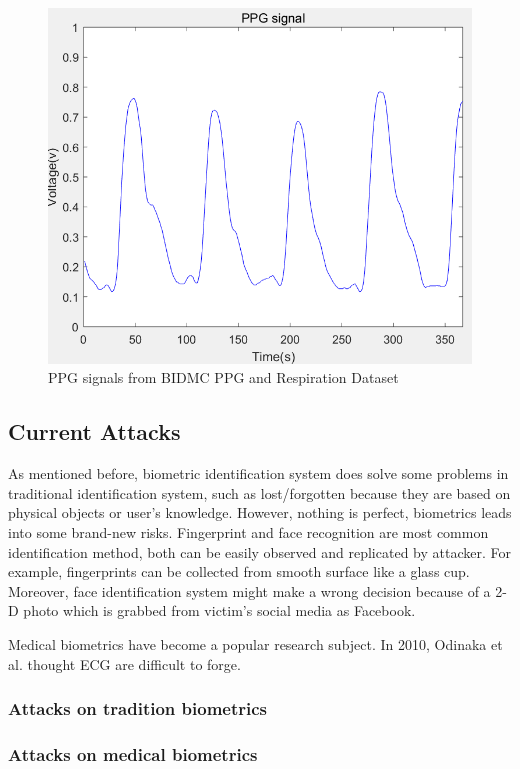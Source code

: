 \documentclass[a4paper,12pt]{article}
\begin{document}
\begin{figure}[H]
\centering
\includegraphics[width = .8\textwidth]{ppg.PNG}
\caption{PPG signals from BIDMC PPG and Respiration Dataset\autocite{PhysioNet}}
\label{fig:ppg}
\end{figure}

\subsection{Current Attacks}
As mentioned before, biometric identification system does solve some problems in traditional identification system, such as lost/forgotten because they are based on physical objects or user's knowledge. However, nothing is perfect, biometrics leads into some brand-new risks. Fingerprint and face recognition are most common identification method, both can be easily observed and replicated by attacker\parencite{Eberz:2018your}. For example, fingerprints can be collected from smooth surface like a glass cup. Moreover, face identification system might make a wrong decision because of a 2-D photo which is grabbed from victim's social media as Facebook.

Medical biometrics have become a popular research subject. In 2010, Odinaka et al. thought ECG are difficult to forge\parencite{Odinaka:2010ecg}.
\subsubsection{Attacks on tradition biometrics}

\subsubsection{Attacks on medical biometrics}
\end{document}
